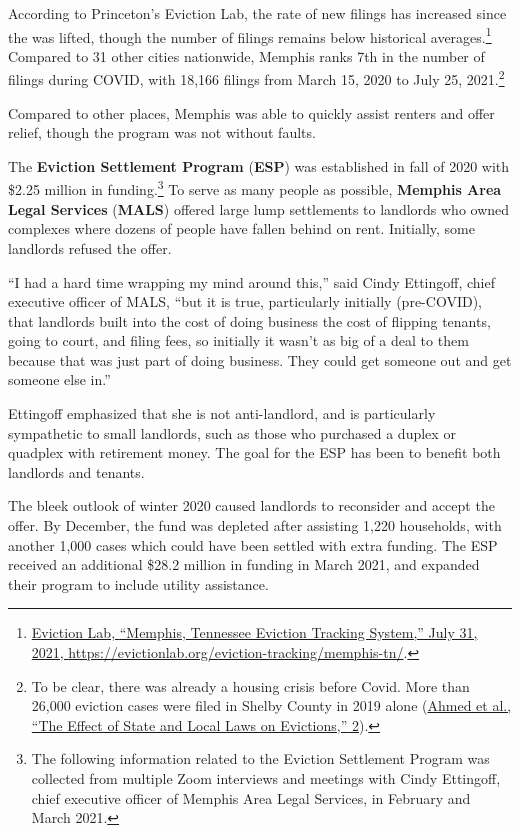 \documentclass[
  openany]{book}
\begin{document}
According to Princeton's Eviction Lab, the rate of new filings has increased since the was lifted, though the number of filings remains below historical averages.\footnote{\protect\hyperlink{ref-evictionlab2021}{Eviction Lab, {``Memphis, Tennessee \textbar{} Eviction Tracking System,''} July 31, 2021, \url{https://evictionlab.org/eviction-tracking/memphis-tn/}}.} Compared to 31 other cities nationwide, Memphis ranks 7th in the number of filings during COVID, with 18,166 filings from March 15, 2020 to July 25, 2021.\footnote{To be clear, there was already a housing crisis before Covid. More than 26,000 eviction cases were filed in Shelby County in 2019 alone (\protect\hyperlink{ref-ahmed2021}{Ahmed et al., {``The Effect of State and Local Laws on Evictions,''} 2}).}

Compared to other places, Memphis was able to quickly assist renters and offer relief, though the program was not without faults.

The \textbf{Eviction Settlement Program} (\textbf{ESP}) was established in fall of 2020 with \$2.25 million in funding.\footnote{The following information related to the Eviction Settlement Program was collected from multiple Zoom interviews and meetings with Cindy Ettingoff, chief executive officer of Memphis Area Legal Services, in February and March 2021.} To serve as many people as possible, \textbf{Memphis Area Legal Services} (\textbf{MALS}) offered large lump settlements to landlords who owned complexes where dozens of people have fallen behind on rent. Initially, some landlords refused the offer.

``I had a hard time wrapping my mind around this,'' said Cindy Ettingoff, chief executive officer of MALS, ``but it is true, particularly initially (pre-COVID), that landlords built into the cost of doing business the cost of flipping tenants, going to court, and filing fees, so initially it wasn't as big of a deal to them because that was just part of doing business. They could get someone out and get someone else in.''

Ettingoff emphasized that she is not anti-landlord, and is particularly sympathetic to small landlords, such as those who purchased a duplex or quadplex with retirement money. The goal for the ESP has been to benefit both landlords and tenants.

The bleek outlook of winter 2020 caused landlords to reconsider and accept the offer. By December, the fund was depleted after assisting 1,220 households, with another 1,000 cases which could have been settled with extra funding. The ESP received an additional \$28.2 million in funding in March 2021, and expanded their program to include utility assistance.
\end{document}
